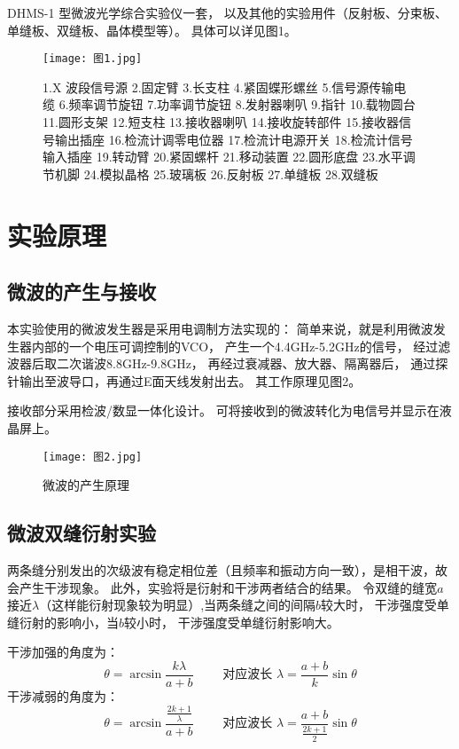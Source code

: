 \documentclass[11pt]{article}
\begin{document}
DHMS-1 型微波光学综合实验仪一套，
以及其他的实验用件（反射板、分束板、单缝板、双缝板、晶体模型等）。
具体可以详见图1。

\begin{figure}[H]
    \centering
    \texttt{[image: 图1.jpg]}
    \caption{1.X 波段信号源 2.固定臂 3.长支柱 4.紧固蝶形螺丝 5.信号源传输电缆
6.频率调节旋钮 7.功率调节旋钮 8.发射器喇叭 9.指针 
10.载物圆台 11.圆形支架 12.短支柱 13.接收器喇叭
14.接收旋转部件 15.接收器信号输出插座 16.检流计调零电位器
17.检流计电源开关 18.检流计信号输入插座 19.转动臂 20.紧固螺杆
21.移动装置 22.圆形底盘 23.水平调节机脚 24.模拟晶格
25.玻璃板 26.反射板 27.单缝板 28.双缝板}
\end{figure}








\section{实验原理}

\subsection{微波的产生与接收}

本实验使用的微波发生器是采用电调制方法实现的：
简单来说，就是利用微波发生器内部的一个电压可调控制的VCO，
产生一个4.4GHz-5.2GHz的信号，
经过滤波器后取二次谐波8.8GHz-9.8GHz，
再经过衰减器、放大器、隔离器后，
通过探针输出至波导口，再通过E面天线发射出去。
其工作原理见图2。

接收部分采用检波/数显一体化设计。
可将接收到的微波转化为电信号并显示在液晶屏上。

\begin{figure}[H]
    \centering
    \texttt{[image: 图2.jpg]}
    \caption{微波的产生原理}
\end{figure}

\subsection{微波双缝衍射实验}

两条缝分别发出的次级波有稳定相位差（且频率和振动方向一致），是相干波，故会产生干涉现象。
此外，实验将是衍射和干涉两者结合的结果。
令双缝的缝宽$a$接近$\lambda$（这样能衍射现象较为明显）,当两条缝之间的间隔$b$较大时，
干涉强度受单缝衍射的影响小，当$b$较小时，
干涉强度受单缝衍射影响大。

干涉加强的角度为：
\begin{displaymath}\theta=\arcsin \frac{k\lambda}{a+b}\qquad \text{ 对应波长 }\lambda=\frac{a+b}{k}\sin \theta\end{displaymath}
干涉减弱的角度为：
\begin{displaymath}\theta=\arcsin \frac{\frac{2k+1}\lambda}{a+b} \qquad \text{ 对应波长 }\lambda=\frac{a+b}{\frac{2k+1}{2}} \sin \theta\end{displaymath}
\end{document}
